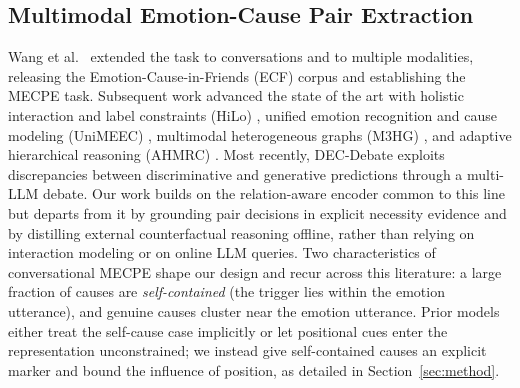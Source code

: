 \documentclass[journal]{IEEEtran}
\begin{document}
\subsection{Multimodal Emotion-Cause Pair Extraction}
Wang et al.~\cite{wang2023mecpe} extended the task to conversations and
to multiple modalities, releasing the Emotion-Cause-in-Friends (ECF) corpus and
establishing the MECPE task. Subsequent work advanced the state of the art with
holistic interaction and label constraints (HiLo) \cite{li2024hilo}, unified emotion
recognition and cause modeling (UniMEEC) \cite{jin2024unimeec}, multimodal
heterogeneous graphs (M3HG) \cite{zhang2024m3hg}, and adaptive hierarchical reasoning
(AHMRC) \cite{li2024ahmrc}. Most recently, DEC-Debate \cite{wu2025decdebate} exploits
discrepancies between discriminative and generative predictions through a multi-LLM
debate. Our work builds on the relation-aware encoder common to this line but departs
from it by grounding pair decisions in explicit necessity evidence and by distilling
external counterfactual reasoning offline, rather than relying on interaction modeling
or on online LLM queries. Two characteristics of conversational MECPE shape our design
and recur across this literature: a large fraction of causes are \emph{self-contained}
(the trigger lies within the emotion utterance), and genuine causes cluster near the
emotion utterance. Prior models either treat the self-cause case implicitly or let
positional cues enter the representation unconstrained; we instead give self-contained
causes an explicit marker and bound the influence of position, as detailed in
Section~\ref{sec:method}.
\end{document}
